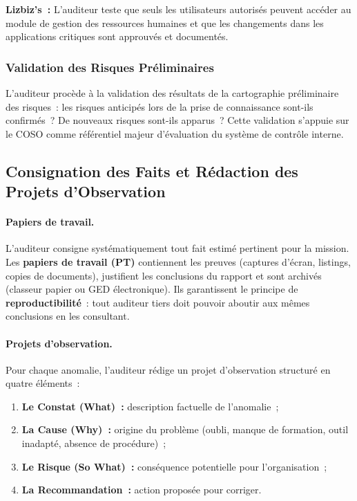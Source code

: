 \begin{boxlizbiz}
\textbf{Lizbiz's~:}
L'auditeur teste que seuls les utilisateurs autorisés peuvent accéder au module
de gestion des ressources humaines et que les changements dans les applications
critiques sont approuvés et documentés.
\end{boxlizbiz}

\subsubsection{Validation des Risques Préliminaires}

L'auditeur procède à la validation des résultats de la cartographie préliminaire des
risques~: les risques anticipés lors de la prise de connaissance sont-ils confirmés~?
De nouveaux risques sont-ils apparus~? Cette validation s'appuie sur le COSO comme
référentiel majeur d'évaluation du système de contrôle interne.

\subsection{Consignation des Faits et Rédaction des Projets d'Observation}
\label{subsec:consignation}

\paragraph{Papiers de travail.}
L'auditeur consigne systématiquement tout fait estimé pertinent pour la mission.
Les \textbf{papiers de travail (PT)} contiennent les preuves (captures d'écran,
listings, copies de documents), justifient les conclusions du rapport et sont archivés
(classeur papier ou GED électronique). Ils garantissent le principe de
\textbf{reproductibilité}~: tout auditeur tiers doit pouvoir aboutir aux mêmes
conclusions en les consultant.

\paragraph{Projets d'observation.}
Pour chaque anomalie, l'auditeur rédige un projet d'observation structuré en quatre
éléments~:
\begin{enumerate}
    \item \textbf{Le Constat (What)~:} description factuelle de l'anomalie~;
    \item \textbf{La Cause (Why)~:} origine du problème (oubli, manque de formation,
        outil inadapté, absence de procédure)~;
    \item \textbf{Le Risque (So What)~:} conséquence potentielle pour l'organisation~;
    \item \textbf{La Recommandation~:} action proposée pour corriger.
\end{enumerate}


